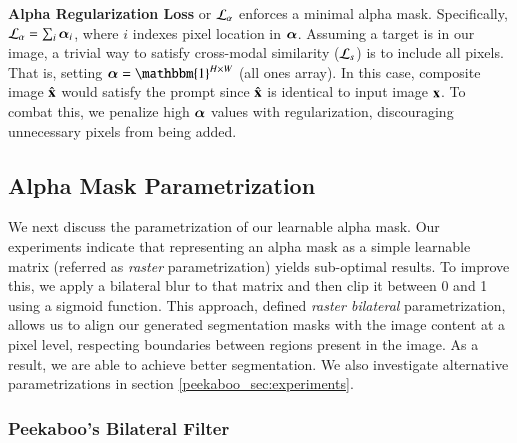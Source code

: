 \label{peekaboo_sec:alpha_reg}
\textbf{Alpha Regularization Loss} or $\mathcal{L}_{\alpha}$ enforces a minimal alpha mask. Specifically, $\mathcal{L}_{\alpha} = \sum_i \boldsymbol{\alpha}_i$, where $i$ indexes pixel location in $\boldsymbol{\alpha}$.
\label{peekaboo_subsec:aux_loss}
Assuming a target is in our image, a trivial way to satisfy cross-modal similarity ($\mathcal{L}_{s}$) is to include all pixels. That is, setting $\alphamask = \mathbbm{1}^{H\times W}$ (all ones array).
In this case, composite image $\hat{\mathbf{x}}$ would satisfy the prompt since $\hat{\mathbf{x}}$ is identical to input image $\mathbf{x}$.
To combat this, we penalize high $\boldsymbol{\alpha}$ values with regularization, discouraging unnecessary pixels from being added. %

\subsection{Alpha Mask Parametrization}
We next discuss the parametrization of our learnable alpha mask. Our experiments indicate that representing an alpha mask as a simple learnable matrix (referred as \textit{raster} parametrization) yields sub-optimal results. To improve this, we apply a bilateral blur to that matrix and then clip it between 0 and 1 using a sigmoid function. 
This approach, defined \textit{raster bilateral} parametrization, allows us to align our generated segmentation masks with the image content at a pixel level, respecting boundaries between regions present in the image. 
As a result, we are able to achieve better segmentation. We also investigate alternative parametrizations in section \ref{peekaboo_sec:experiments}.

\subsubsection{Peekaboo's Bilateral Filter}
\label{peekaboo_sec:bilateralfiltersubsub}

